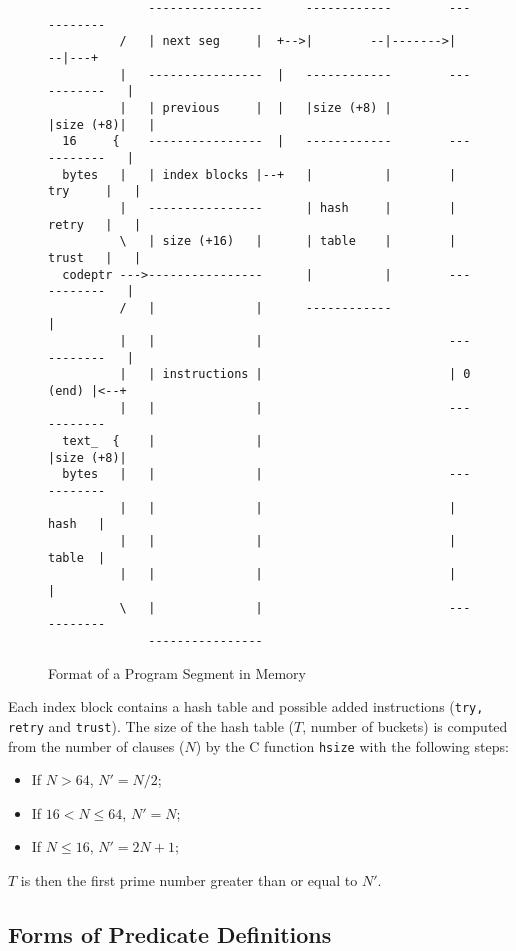\documentclass[11pt]{article}
\begin{document}
\begin{figure}
\begin{verbatim}
              ----------------      ------------        -----------
          /   | next seg     |  +-->|        --|------->|       --|---+
          |   ----------------  |   ------------        -----------   |
          |   | previous     |  |   |size (+8) |        |size (+8)|   |
  16     {    ----------------  |   ------------        -----------   |
  bytes   |   | index blocks |--+   |          |        | try     |   |
          |   ----------------      | hash     |        | retry   |   |
          \   | size (+16)   |      | table    |        | trust   |   |
  codeptr --->----------------      |          |        -----------   |
          /   |              |      ------------                      |
          |   |              |                          -----------   |
          |   | instructions |                          | 0 (end) |<--+
          |   |              |                          -----------
  text_  {    |              |                          |size (+8)|
  bytes   |   |              |                          -----------
          |   |              |                          |  hash   |
          |   |              |                          |  table  |
          |   |              |                          |         |
          \   |              |                          -----------
              ----------------
\end{verbatim}
\caption{Format of a Program Segment in Memory}
\label{f:programseg}
\end{figure}

Each index block contains a hash table and possible added instructions
({\tt try, retry} and {\tt trust}). The size of the hash table
($T$, number of buckets) is computed from the number of clauses ($N$) by the C
function {\tt hsize} with the following steps:

\begin{itemize}
  \item If $N>64$, $N' = N/2$;
  \item If $16 < N \leq 64$, $N' = N$;
  \item If $N \leq 16$, $N' = 2N+1$;
\end{itemize}

$T$ is then the first prime number greater than or equal to $N'$.


\subsection{Forms of Predicate Definitions}
\end{document}
